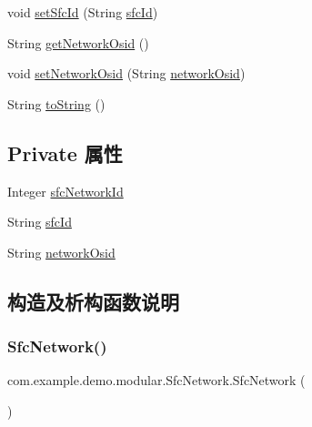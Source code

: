 \begin{DoxyCompactItemize}
void \mbox{\hyperlink{classcom_1_1example_1_1demo_1_1modular_1_1_sfc_network_aa1a2fdedbf5aa223f9a0ac0e34f45f2e}{set\+Sfc\+Id}} (String \mbox{\hyperlink{classcom_1_1example_1_1demo_1_1modular_1_1_sfc_network_ac12f9b32b0341d0773a1740d96319fd6}{sfc\+Id}})
\item 
String \mbox{\hyperlink{classcom_1_1example_1_1demo_1_1modular_1_1_sfc_network_a9ebc23ecef874137be13dd84bae4fd9c}{get\+Network\+Osid}} ()
\item 
void \mbox{\hyperlink{classcom_1_1example_1_1demo_1_1modular_1_1_sfc_network_a7a49c51c7915e6eeac6c28db150ed39a}{set\+Network\+Osid}} (String \mbox{\hyperlink{classcom_1_1example_1_1demo_1_1modular_1_1_sfc_network_a618bd5cc969b51e60c80013089b723a9}{network\+Osid}})
\item 
String \mbox{\hyperlink{classcom_1_1example_1_1demo_1_1modular_1_1_sfc_network_a2353a67e90a309baaa27984ada821f78}{to\+String}} ()
\end{DoxyCompactItemize}
\subsection*{Private 属性}
\begin{DoxyCompactItemize}
\item 
Integer \mbox{\hyperlink{classcom_1_1example_1_1demo_1_1modular_1_1_sfc_network_ac72a53a8f025c5bd50d26846425948ce}{sfc\+Network\+Id}}
\item 
String \mbox{\hyperlink{classcom_1_1example_1_1demo_1_1modular_1_1_sfc_network_ac12f9b32b0341d0773a1740d96319fd6}{sfc\+Id}}
\item 
String \mbox{\hyperlink{classcom_1_1example_1_1demo_1_1modular_1_1_sfc_network_a618bd5cc969b51e60c80013089b723a9}{network\+Osid}}
\end{DoxyCompactItemize}


\subsection{构造及析构函数说明}
\mbox{\label{classcom_1_1example_1_1demo_1_1modular_1_1_sfc_network_a91d61ba2e383277cb685830875f75a7e}} 
\subsubsection{\texorpdfstring{Sfc\+Network()}{SfcNetwork()}\hspace{0.1cm}{\footnotesize\ttfamily [1/3]}}
{\footnotesize\ttfamily com.\+example.\+demo.\+modular.\+Sfc\+Network.\+Sfc\+Network (\begin{DoxyParamCaption}{ }\end{DoxyParamCaption})}

